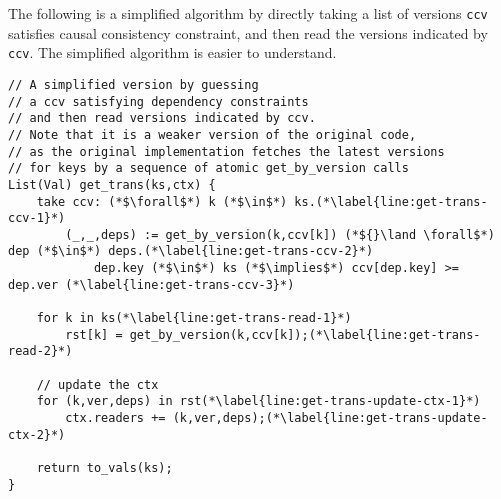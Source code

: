 The following is a simplified algorithm by directly taking a list of versions \verb|ccv| satisfies causal consistency constraint,
and then read the versions indicated by \verb|ccv|.
The simplified algorithm is easier to understand.
\begin{lstlisting}[caption={get\_trans},label={lst:get-trans}]
// A simplified version by guessing
// a ccv satisfying dependency constraints
// and then read versions indicated by ccv.
// Note that it is a weaker version of the original code,
// as the original implementation fetches the latest versions
// for keys by a sequence of atomic get_by_version calls
List(Val) get_trans(ks,ctx) {
    take ccv: (*$\forall$*) k (*$\in$*) ks.(*\label{line:get-trans-ccv-1}*)
        (_,_,deps) := get_by_version(k,ccv[k]) (*${}\land \forall$*) dep (*$\in$*) deps.(*\label{line:get-trans-ccv-2}*)
            dep.key (*$\in$*) ks (*$\implies$*) ccv[dep.key] >= dep.ver (*\label{line:get-trans-ccv-3}*)

    for k in ks(*\label{line:get-trans-read-1}*)
        rst[k] = get_by_version(k,ccv[k]);(*\label{line:get-trans-read-2}*)

    // update the ctx
    for (k,ver,deps) in rst(*\label{line:get-trans-update-ctx-1}*)
        ctx.readers += (k,ver,deps);(*\label{line:get-trans-update-ctx-2}*)

    return to_vals(ks);
}                                   
\end{lstlisting}
